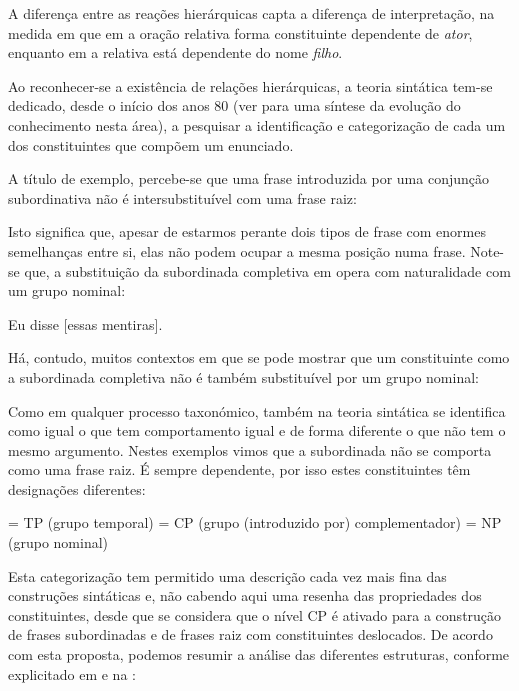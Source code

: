 \documentclass[output=paper,colorlinks,citecolor=brown,booklanguage=portuguese]{langscibook}
\begin{document}
A diferença entre as reações hierárquicas capta a diferença de interpretação, na medida em que em  a oração relativa forma constituinte dependente de \emph{ator}, enquanto em  a relativa está dependente do nome \emph{filho}.

Ao reconhecer-se a existência de relações hierárquicas, a teoria sintática tem-se dedicado, desde o início dos anos 80 (ver \citealt{Rizzi2016} para uma síntese da evolução do conhecimento nesta área), a pesquisar a identificação e categorização de cada um dos constituintes que compõem um enunciado.

A título de exemplo, percebe-se que uma frase introduzida por uma conjunção subordinativa não é intersubstituível com uma frase raiz:

\ea
    \label{ex:cap2ex25a}
    \label{ex:cap2ex25b}
    \label{ex:cap2ex25c}
    \label{ex:cap2ex25d}
    \z
\z

Isto significa que, apesar de estarmos perante dois tipos de frase com enormes semelhanças entre si, elas não podem ocupar a mesma posição numa frase. Note-se que, a substituição da subordinada completiva em  opera com naturalidade com um grupo nominal:

\ea\label{ex:cap2ex26} Eu disse [essas mentiras].
\z

Há, contudo, muitos contextos em que se pode mostrar que um constituinte como a subordinada completiva não é também substituível por um grupo nominal:

\ea\label{ex:cap2ex27}
    \z
\z

Como em qualquer processo taxonómico, também na teoria sintática se identifica como igual o que tem comportamento igual e de forma diferente o que não tem o mesmo argumento. Nestes exemplos vimos que a subordinada não se comporta como uma frase raiz. É sempre dependente, por isso estes constituintes têm designações diferentes:

\ea\label{ex:cap2ex28}
         = TP (grupo temporal)
         = CP (grupo (introduzido por) complementador)
         = NP (grupo nominal)
    \z
\z

Esta categorização tem permitido uma descrição cada vez mais fina das construções sintáticas e, não cabendo aqui uma resenha das propriedades dos constituintes, desde \citet{Chomsky1986} que se considera que o nível CP é ativado para a construção de frases subordinadas e de frases raiz com constituintes deslocados. De acordo com esta proposta, podemos resumir a análise das diferentes estruturas, conforme explicitado em  e na :
\end{document}
